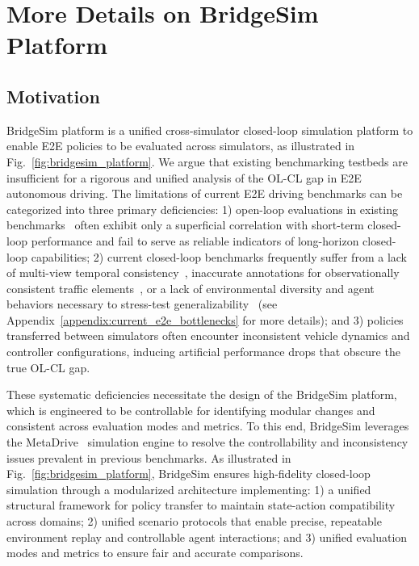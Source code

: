\documentclass{article}
\begin{document}
\section{More Details on BridgeSim Platform}
\label{appendix:bridgesim_platform}

\subsection{Motivation}
BridgeSim platform is a unified cross-simulator closed-loop simulation platform to enable E2E policies to be evaluated across simulators, as illustrated in Fig.~\ref{fig:bridgesim_platform}. We argue that existing benchmarking testbeds are insufficient for a rigorous and unified analysis of the OL-CL gap in E2E autonomous driving. The limitations of current E2E driving benchmarks can be categorized into three primary deficiencies: 1) open-loop evaluations in existing benchmarks~\cite{navsimv1, navsimv2} often exhibit only a superficial correlation with short-term closed-loop performance and fail to serve as reliable indicators of long-horizon closed-loop capabilities; 2) current closed-loop benchmarks frequently suffer from a lack of multi-view temporal consistency~\cite{yang2024drivearena}, inaccurate annotations for observationally consistent traffic elements~\cite{zhou2024hugsim}, or a lack of environmental diversity and agent behaviors necessary to stress-test generalizability~\cite{jia2024bench} (see Appendix~\ref{appendix:current_e2e_bottlenecks} for more details); and 3) policies transferred between simulators often encounter inconsistent vehicle dynamics and controller configurations, inducing artificial performance drops that obscure the true OL-CL gap.

These systematic deficiencies necessitate the design of the BridgeSim platform, which is engineered to be controllable for identifying modular changes and consistent across evaluation modes and metrics. To this end, BridgeSim leverages the MetaDrive~\cite{li2022metadrive, li2023scenarionet} simulation engine to resolve the controllability and inconsistency issues prevalent in previous benchmarks. As illustrated in Fig.~\ref{fig:bridgesim_platform}, BridgeSim ensures high-fidelity closed-loop simulation through a modularized architecture implementing: 1) a unified structural framework for policy transfer to maintain state-action compatibility across domains; 2) unified scenario protocols that enable precise, repeatable environment replay and controllable agent interactions; and 3) unified evaluation modes and metrics to ensure fair and accurate comparisons.
\end{document}
